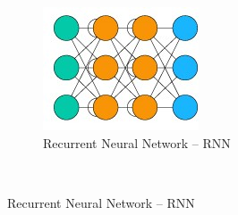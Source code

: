 \begin{figure}[!ht]
\begin{subfigure}[h]{0.3\linewidth}
	\end{subfigure}
	\hspace{0.1cm}
	\begin{subfigure}[h]{0.3\linewidth}
		\centering
		\caption{Recurrent Neural Network -- RNN}
		\label{fig:rnn}
		\includegraphics[width=0.6\linewidth]{img/pop_arch/rnn.jpg}
	\end{subfigure}\\


\end{figure}
